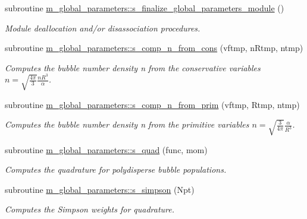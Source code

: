 \begin{DoxyCompactItemize}
subroutine \hyperlink{namespacem__global__parameters_aa2237c2ed3662bbd69ef39e2e92af7bf}{m\+\_\+global\+\_\+parameters\+::s\+\_\+finalize\+\_\+global\+\_\+parameters\+\_\+module} ()
\begin{DoxyCompactList}\small\item\em Module deallocation and/or disassociation procedures. \end{DoxyCompactList}\item 
subroutine \hyperlink{namespacem__global__parameters_aac1a5a73b1eae759c913983b38047167}{m\+\_\+global\+\_\+parameters\+::s\+\_\+comp\+\_\+n\+\_\+from\+\_\+cons} (vftmp, n\+Rtmp, ntmp)
\begin{DoxyCompactList}\small\item\em Computes the bubble number density n from the conservative variables $ n = \sqrt{ \frac{4 \pi}{3} } \frac{ nR^3}{\alpha} $. \end{DoxyCompactList}\item 
subroutine \hyperlink{namespacem__global__parameters_acdaa3827df6fee38a3e55e8b13130c27}{m\+\_\+global\+\_\+parameters\+::s\+\_\+comp\+\_\+n\+\_\+from\+\_\+prim} (vftmp, Rtmp, ntmp)
\begin{DoxyCompactList}\small\item\em Computes the bubble number density n from the primitive variables $ n = \sqrt{ \frac{3}{4 \pi} } \frac{ \alpha }{ R^3} $. \end{DoxyCompactList}\item 
subroutine \hyperlink{namespacem__global__parameters_aa5a48fa9cc196136634022cfa6708213}{m\+\_\+global\+\_\+parameters\+::s\+\_\+quad} (func, mom)
\begin{DoxyCompactList}\small\item\em Computes the quadrature for polydisperse bubble populations. \end{DoxyCompactList}\item 
subroutine \hyperlink{namespacem__global__parameters_a78f4bf8bb59af4396bf11aca330463ec}{m\+\_\+global\+\_\+parameters\+::s\+\_\+simpson} (Npt)
\begin{DoxyCompactList}\small\item\em Computes the Simpson weights for quadrature. \end{DoxyCompactList}\end{DoxyCompactItemize}
